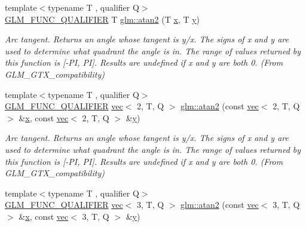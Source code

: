 \begin{DoxyCompactItemize}
{\footnotesize template$<$typename T , qualifier Q$>$ }\\\hyperlink{setup_8hpp_a33fdea6f91c5f834105f7415e2a64407}{G\+L\+M\+\_\+\+F\+U\+N\+C\+\_\+\+Q\+U\+A\+L\+I\+F\+I\+ER} T \hyperlink{group__gtx__compatibility_gac63011205bf6d0be82589dc56dd26708}{glm\+::atan2} (T \hyperlink{_s_d_l__opengl_8h_ad0e63d0edcdbd3d79554076bf309fd47}{x}, T \hyperlink{_s_d_l__opengl_8h_a1675d9d7bb68e1657ff028643b4037e3}{y})
\begin{DoxyCompactList}\small\item\em Arc tangent. Returns an angle whose tangent is y/x. The signs of x and y are used to determine what quadrant the angle is in. The range of values returned by this function is \mbox{[}-\/\+PI, PI\mbox{]}. Results are undefined if x and y are both 0. (From G\+L\+M\+\_\+\+G\+T\+X\+\_\+compatibility) \end{DoxyCompactList}\item 
{\footnotesize template$<$typename T , qualifier Q$>$ }\\\hyperlink{setup_8hpp_a33fdea6f91c5f834105f7415e2a64407}{G\+L\+M\+\_\+\+F\+U\+N\+C\+\_\+\+Q\+U\+A\+L\+I\+F\+I\+ER} \hyperlink{structglm_1_1vec}{vec}$<$ 2, T, Q $>$ \hyperlink{group__gtx__compatibility_ga83bc41bd6f89113ee8006576b12bfc50}{glm\+::atan2} (const \hyperlink{structglm_1_1vec}{vec}$<$ 2, T, Q $>$ \&\hyperlink{_s_d_l__opengl_8h_ad0e63d0edcdbd3d79554076bf309fd47}{x}, const \hyperlink{structglm_1_1vec}{vec}$<$ 2, T, Q $>$ \&\hyperlink{_s_d_l__opengl_8h_a1675d9d7bb68e1657ff028643b4037e3}{y})
\begin{DoxyCompactList}\small\item\em Arc tangent. Returns an angle whose tangent is y/x. The signs of x and y are used to determine what quadrant the angle is in. The range of values returned by this function is \mbox{[}-\/\+PI, PI\mbox{]}. Results are undefined if x and y are both 0. (From G\+L\+M\+\_\+\+G\+T\+X\+\_\+compatibility) \end{DoxyCompactList}\item 
{\footnotesize template$<$typename T , qualifier Q$>$ }\\\hyperlink{setup_8hpp_a33fdea6f91c5f834105f7415e2a64407}{G\+L\+M\+\_\+\+F\+U\+N\+C\+\_\+\+Q\+U\+A\+L\+I\+F\+I\+ER} \hyperlink{structglm_1_1vec}{vec}$<$ 3, T, Q $>$ \hyperlink{group__gtx__compatibility_gac39314f5087e7e51e592897cabbc1927}{glm\+::atan2} (const \hyperlink{structglm_1_1vec}{vec}$<$ 3, T, Q $>$ \&\hyperlink{_s_d_l__opengl_8h_ad0e63d0edcdbd3d79554076bf309fd47}{x}, const \hyperlink{structglm_1_1vec}{vec}$<$ 3, T, Q $>$ \&\hyperlink{_s_d_l__opengl_8h_a1675d9d7bb68e1657ff028643b4037e3}{y})

\end{DoxyCompactItemize}
